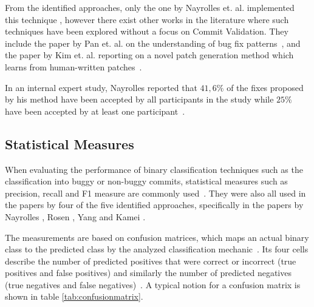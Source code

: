 From the identified approaches, only the one by Nayrolles et. al. implemented this technique \cite{Nayrolles2018}, however there exist other works in the literature where such techniques have been explored without a focus on Commit Validation. %
They include the paper by Pan et. al. on the understanding of bug fix patterns~\cite{Pan2009}, and the paper by Kim et. al. reporting on a novel patch generation method which learns from human-written patches~\cite{Kim2013}.

In an internal expert study, Nayrolles reported that $41,6\%$ of the fixes proposed by his method have been accepted by all participants in the study while $25\%$ have been accepted by at least one participant~\cite{Nayrolles2018}.

\subsection{Statistical Measures}
\label{sec:statisticalmeasures}


When evaluating the performance of binary classification techniques such as the classification into buggy or non-buggy commits, statistical measures such as precision, recall and F1 measure are commonly used~\cite{Powers2007}. They were also all used in the papers by four of the five identified approaches, specifically in the papers by Nayrolles \cite{Nayrolles2018}, Rosen \cite{Rosen2015}, Yang \cite{Yang2015} and Kamei \cite{Kamei2013}.


The measurements are based on confusion matrices, which maps an actual binary class to the predicted class by the analyzed classification mechanic~\cite{Powers2007}. Its four cells describe the number of predicted positives that were correct or incorrect (true positives and false positives) and similarly the number of predicted negatives (true negatives and false negatives)~\cite{Fawcett2006}. A typical notion for a confusion matrix is shown in table \ref{tab:confusionmatrix}.

